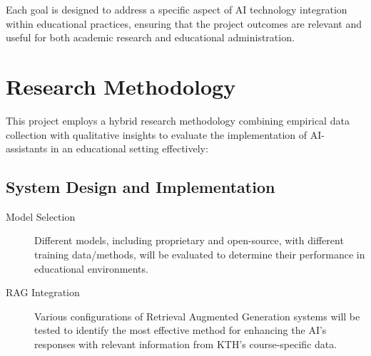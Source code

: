Each goal is designed to address a specific aspect of AI technology integration within educational practices, ensuring that the project outcomes are relevant and useful for both academic research and educational administration.



\section{Research Methodology}
\label{sec:research_methodology}


This project employs a hybrid research methodology combining empirical data collection with qualitative insights to evaluate the implementation of AI-assistants in an educational setting effectively:

\subsection{System Design and Implementation}
\begin{description}
	\item[Model Selection] Different models, including proprietary and open-source, with different training data/methods, will be evaluated to determine their performance in educational environments.
	\item[RAG Integration] Various configurations of Retrieval Augmented Generation systems will be tested to identify the most effective method for enhancing the AI's responses with relevant information from KTH’s course-specific data.
\end{description}

